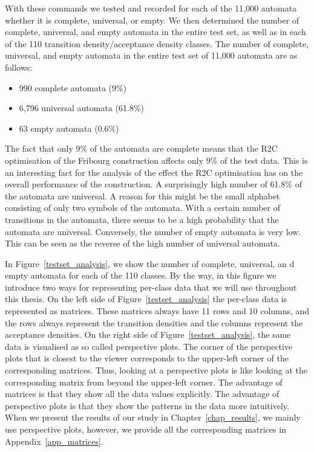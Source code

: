 With these \goal{} commands we tested and recorded for each of the 11,000 automata whether it is complete, universal, or empty. We then determined the number of complete, universal, and empty automata in the entire test set, as well as in each of the 110 transition density/acceptance density classes. The number of complete, universal, and empty automata in the entire test set of 11,000 automata are as follows:

\begin{itemize}
\item 990 complete automata (9\%)
\item 6,796 universal automata (61.8\%)
\item 63 empty automata (0.6\%)
\end{itemize}

The fact that only 9\% of the automata are complete means that the R2C optimisation of the Fribourg construction affects only 9\% of the test data. This is an interesting fact for the analysis of the effect the R2C optimisation has on the overall performance of the construction. A surprisingly high number of 61.8\% of the automata are universal. A reason for this might be the small alphabet consisting of only two symbols of the automata. With a certain number of transitions in the automata, there seems to be a high probability that the automata are universal. Conversely, the number of empty automata is very low. This can be seen as the reverse of the high number of universal automata.

In Figure~\ref{testset_analysis}, we show the number of complete, universal, an d empty automata for each of the 110 classes. By the way, in this figure we introduce two ways for representing per-class data that we will use throughout this thesis. On the left side of Figure~\ref{testset_analysis} the per-class data is represented as matrices. These matrices always have 11 rows and 10 columns, and the rows always represent the transition densities and the columns represent the acceptance densities. On the right side of Figure~\ref{testset_analysis}, the same data is visualised as so called perspective plots. The corner of the perspective plots that is closest to the viewer corresponds to the upper-left corner of the corresponding matrices. Thus, looking at a perspective plots is like looking at the corresponding matrix from beyond the upper-left corner. The advantage of matrices is that they show all the data values explicitly. The advantage of perspective plots is that they show the patterns in the data more intuitively. When we present the results of our study in Chapter~\ref{chap_results}, we mainly use perspective plots, however, we provide all the corresponding matrices in Appendix~\ref{app_matrices}.

